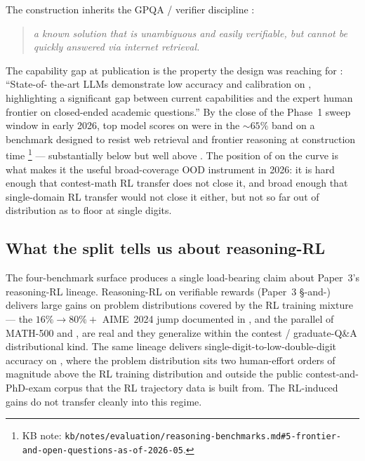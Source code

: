 The construction inherits the GPQA /  verifier discipline
\citep[\S{}sec-format]{phan2025-hle}:

\begin{quote}\itshape
a known solution that is unambiguous and easily verifiable, but
cannot be quickly answered via internet retrieval.
\end{quote}

The capability gap at publication is the property the design was
reaching for \citep[\S{}sec-capability-gap]{phan2025-hle}: ``State-of-
the-art LLMs demonstrate low accuracy and calibration on ,
highlighting a significant gap between current  capabilities and
the expert human frontier on closed-ended academic questions.'' By
the close of the Phase~1 sweep window in early 2026, top model
scores on  were in the $\sim 65\%$ band on a benchmark designed
to resist web retrieval and frontier reasoning at construction time%
\footnote{KB note: \texttt{kb/notes/evaluation/reasoning-benchmarks.md\#5-frontier-and-open-questions-as-of-2026-05}.}
--- substantially below   but well above .
The position of  on the  curve is what makes it the
useful broad-coverage OOD instrument in 2026: it is hard enough that
contest-math RL transfer does not close it, and broad enough that
single-domain RL transfer would not close it either, but not so far
out of distribution as to floor at single digits.

\subsection{What the split tells us about reasoning-RL}
\label{sec:reasoning-rl-implications}

The four-benchmark surface produces a single load-bearing claim
about Paper~3's reasoning-RL lineage. Reasoning-RL on verifiable
rewards (Paper~3 §-and-) delivers large gains on
problem distributions covered by the RL training mixture --- the
$16\% \to 80\%+$ AIME~2024 jump documented in
\citet[\S{}3]{deepseek-r1}, and the parallel  of MATH-500
and , are real and they generalize within the contest /
graduate-Q\&A distributional kind. The same lineage delivers
single-digit-to-low-double-digit accuracy on , where
the problem distribution sits two human-effort orders of magnitude
above the RL training distribution and outside the public
contest-and-PhD-exam corpus that the RL trajectory data is built
from. The RL-induced gains do not transfer cleanly into this regime.

